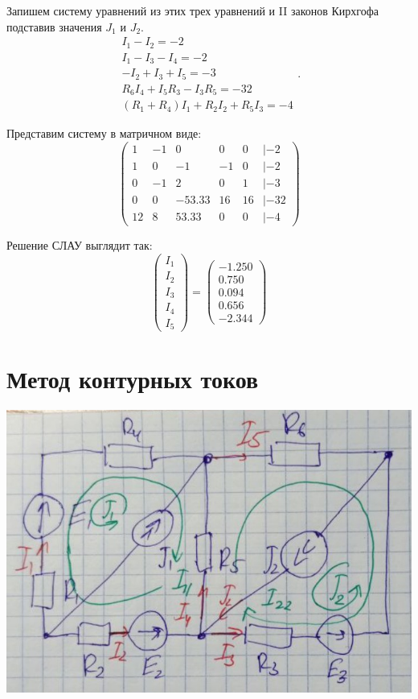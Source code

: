 \documentclass[14pt, a4paper]{article}
\begin{document}
    Запишем систему уравнений из этих трех уравнений и II законов Кирхгофа подставив значения $J_1$ и $J_2$.
    $$\begin{aligned}
    I_1 - I_2 = -2 \\
    I_1 - I_3 - I_4 = -2 \\
    -I_2 + I_3 + I_5 = -3 \\
    R_6I_4 + I_5R_3 - I_3R_5 = -32 \\
    (R_1+R_4)I_1 + R_2I_2 + R_5I_3 = -4
    \end{aligned}.$$

    Представим систему в матричном виде:
    $$\begin{pmatrix} 
    1 & -1 & 0 & 0 & 0 & | -2  \\ 
    1 & 0 & -1 & -1 & 0 & | -2 \\ 
    0 & -1 & 2 & 0 & 1 & | -3 \\ 
    0 & 0 & -53.33 & 16 & 16 & | -32 \\ 
    12 & 8 & 53.33 & 0 & 0 & | -4
    \end{pmatrix}$$

    Решение СЛАУ выглядит так:
    $$\begin{pmatrix}  
    I_1  \\ 
    I_2 \\ 
    I_3 \\ 
    I_4 \\ 
    I_5
    \end{pmatrix} = 
    \begin{pmatrix}
    -1.250 \\ 
    0.750 \\ 
    0.094 \\ 
    0.656 \\ 
    -2.344
    \end{pmatrix}
    $$

\section*{Метод контурных токов}

    \includegraphics[width=1\textwidth]{MKT.jpg}
\end{document}
